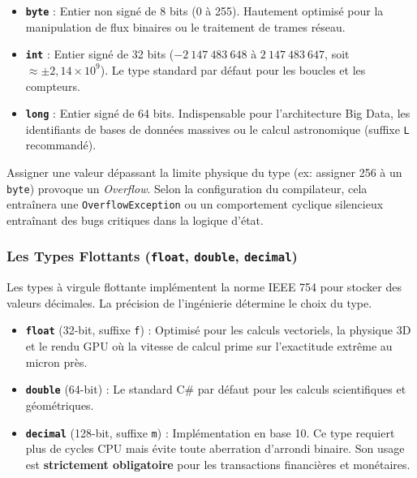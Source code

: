 \begin{itemize}
    \item \textbf{\texttt{byte}} : Entier non signé de 8 bits (0 à 255). Hautement optimisé pour la manipulation de flux binaires ou le traitement de trames réseau.
    \item \textbf{\texttt{int}} : Entier signé de 32 bits ($-2\ 147\ 483\ 648$ à $2\ 147\ 483\ 647$, soit $\approx \pm 2,14 \times 10^9$). Le type standard par défaut pour les boucles et les compteurs.
    \item \textbf{\texttt{long}} : Entier signé de 64 bits. Indispensable pour l'architecture Big Data, les identifiants de bases de données massives ou le calcul astronomique (suffixe \texttt{L} recommandé).
\end{itemize}

\begin{tcolorbox}[colback=backcolour,colframe=keywordcolor,title=\textbf{L'Overflow (Dépassement de Capacité)}]
    Assigner une valeur dépassant la limite physique du type (ex: assigner 256 à un \texttt{byte}) provoque un \emph{Overflow}. Selon la configuration du compilateur, cela entraînera une \texttt{OverflowException} ou un comportement cyclique silencieux entraînant des bugs critiques dans la logique d'état.
\end{tcolorbox}

\subsubsection{Les Types Flottants (\texttt{float}, \texttt{double}, \texttt{decimal})}
Les types à virgule flottante implémentent la norme IEEE 754 pour stocker des valeurs décimales. La précision de l'ingénierie détermine le choix du type.

\begin{itemize}
    \item \textbf{\texttt{float}} (32-bit, suffixe \texttt{f}) : Optimisé pour les calculs vectoriels, la physique 3D et le rendu GPU où la vitesse de calcul prime sur l'exactitude extrême au micron près.
    \item \textbf{\texttt{double}} (64-bit) : Le standard C\# par défaut pour les calculs scientifiques et géométriques.
    \item \textbf{\texttt{decimal}} (128-bit, suffixe \texttt{m}) : Implémentation en base 10. Ce type requiert plus de cycles CPU mais évite toute aberration d'arrondi binaire. Son usage est \textbf{strictement obligatoire} pour les transactions financières et monétaires.
\end{itemize}

